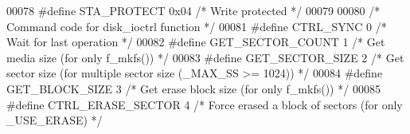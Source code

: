 \begin{DoxyCode}
00078 \textcolor{preprocessor}{#define STA\_PROTECT    0x04  }\textcolor{comment}{/* Write protected */}\textcolor{preprocessor}{}
00079 
00080 \textcolor{comment}{/* Command code for disk\_ioctrl function */}
00081 \textcolor{preprocessor}{#define CTRL\_SYNC      0  }\textcolor{comment}{/* Wait for last operation */}\textcolor{preprocessor}{}
00082 \textcolor{preprocessor}{#define GET\_SECTOR\_COUNT  1  }\textcolor{comment}{/* Get media size (for only f\_mkfs()) */}\textcolor{preprocessor}{}
00083 \textcolor{preprocessor}{#define GET\_SECTOR\_SIZE    2  }\textcolor{comment}{/* Get sector size (for multiple sector size (\_MAX\_SS >= 1024)) */}\textcolor{preprocessor}{}
00084 \textcolor{preprocessor}{#define GET\_BLOCK\_SIZE    3  }\textcolor{comment}{/* Get erase block size (for only f\_mkfs()) */}\textcolor{preprocessor}{}
00085 \textcolor{preprocessor}{#define CTRL\_ERASE\_SECTOR  4  }\textcolor{comment}{/* Force erased a block of sectors (for only \_USE\_ERASE) */}\textcolor{preprocessor}{}
\end{DoxyCode}
